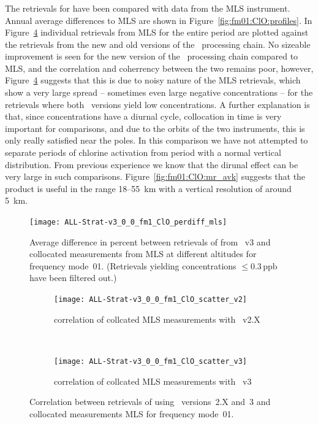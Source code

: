 \subsubsection{}
\label{sec:fm01:comparison:ClO}
The retrievals for  have been compared with data from the MLS
instrument. Annual average differences to MLS are shown in
Figure~\ref{fig:fm01:ClO:profiles}. In Figure~\ref{fig:fm01:ClO:scatter}
individual retrievals from MLS for the entire period are plotted against the
retrievals from the new and old versions of the \smr\ processing chain. No
sizeable improvement is seen for the new version of the \smr\ processing chain
compared to MLS, and the correlation and coherrency between the two remains
poor, however, Figure~\ref{fig:fm01:ClO:scatter} suggests that this is due to
noisy nature of the MLS retrievals, which show a very large spread -- sometimes
even large negative concentrations -- for the retrievals where both \smr\
versions yield low  concentrations. A further  explanation is
that, since \chem{ClO} concentrations have a diurnal cycle, collocation in time
is very important for comparisons, and due to the orbits of the two
instruments, this is only really satisfied near the poles. In this comparison
we have not attempted to separate periods of chlorine activation from period
with a normal vertical distribution. From previous experience we know that the
dirunal effect can be very large in such comparisons.
Figure~\ref{fig:fm01:ClO:mr_avk} suggests that the product is useful in the
range 18--55~km with a vertical resolution of around 5~km.


\begin{figure}[tbhp]
    \centering
    \texttt{[image: ALL-Strat-v3\_0\_0\_fm1\_ClO\_perdiff\_mls]}
    \caption{Average difference in percent between retrievals of 
    from \smr~v3 and collocated measurements from MLS at
    different altitudes for frequency mode~01. (Retrievals yielding
    concentrations $\leq 0.3\,\mathrm{ppb}$ have been filtered out.)}
    \label{fig:fm01:ClO:profiles}
    \label{fig:fm01:ClO:profiles:MLS}
\end{figure}

\begin{figure}[tbhp]
    \centering
    \begin{subfigure}[b]{0.49\textwidth}
        \texttt{[image: ALL-Strat-v3\_0\_0\_fm1\_ClO\_scatter\_v2]}
        \caption{correlation of collcated MLS measurements with \smr~v2.X}
        \label{fig:fm01:ClO:scatter:v2}
    \end{subfigure}
    \,
    \begin{subfigure}[b]{0.49\textwidth}
        \texttt{[image: ALL-Strat-v3\_0\_0\_fm1\_ClO\_scatter\_v3]}
        \caption{correlation of collcated MLS measurements with \smr~v3}
        \label{fig:fm01:ClO:scatter:v3}
    \end{subfigure}
    \caption{Correlation between retrievals of  using \smr\
    versions~2.X and~3 and collocated measurements MLS for frequency mode~01.}
    \label{fig:fm01:ClO:scatter}
\end{figure}

